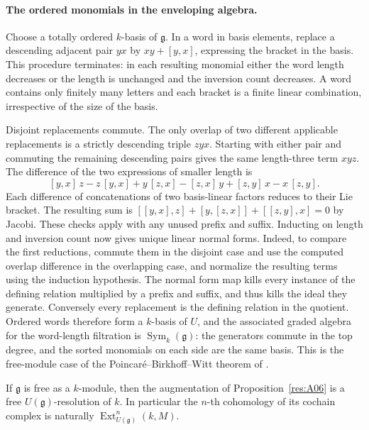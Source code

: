 \paragraph{The ordered monomials in the enveloping algebra.}
Choose a totally ordered \(k\)-basis of \(\mathfrak g\). In a word
in basis elements, replace a descending adjacent pair \(yx\) by
\(xy+[y,x]\), expressing the bracket in the basis. This procedure
terminates: in each resulting monomial either the word length
decreases or the length is unchanged and the inversion count
decreases. A word contains only finitely many letters and each
bracket is a finite linear combination, irrespective of the size
of the basis.

Disjoint replacements commute. The only overlap of two different
applicable replacements is a strictly descending triple \(zyx\).
Starting with either pair and commuting the remaining descending
pairs gives the same length-three term \(xyz\). The difference
of the two expressions of smaller length is
\[
 [y,x]\,z-z\,[y,x]+y\,[z,x]-[z,x]\,y+[z,y]\,x-x\,[z,y].
\]
Each difference of concatenations of two basis-linear factors
reduces to their Lie bracket. The resulting sum is
\([[y,x],z]+[y,[z,x]]+[[z,y],x]=0\) by Jacobi. These checks apply
with any unused prefix and suffix. Inducting on length and inversion
count now gives unique linear normal forms. Indeed, to compare the
first reductions, commute them in the disjoint case and use the
computed overlap difference in the overlapping case, and normalize
the resulting terms using the induction hypothesis. The normal form
map kills every instance of the defining relation multiplied by
a prefix and suffix, and thus kills the ideal they generate.
Conversely every replacement is the defining relation in the quotient.
Ordered words therefore form a \(k\)-basis of \(U\), and the
associated graded algebra for the word-length filtration is
\(\operatorname{Sym}_k(\mathfrak g)\): the generators commute in
the top degree, and the sorted monomials on each side are the
same basis. This is the free-module case of the
Poincar\'e--Birkhoff--Witt theorem of \cite[Theorem 7.3.7]{weibel}.

\begin{theorem}\label{res:A07}
If \(\mathfrak g\) is free as a \(k\)-module, then the augmentation
of Proposition~\ref{res:A06} is a free \(U(\mathfrak g)\)-resolution
of \(k\). In particular the \(n\)-th cohomology of its cochain
complex is naturally \(\operatorname{Ext}^n_{U(\mathfrak g)}(k,M)\).
\end{theorem}

